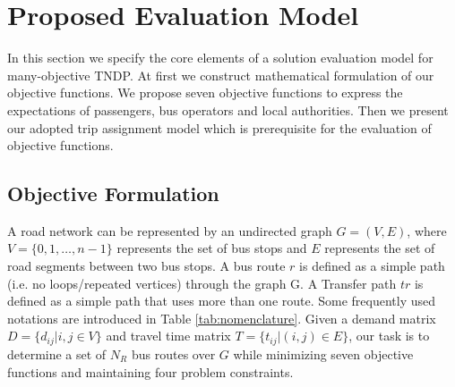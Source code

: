 
\section{Proposed Evaluation Model}

In this section we specify the core elements of a solution evaluation model for many-objective TNDP. At first we construct mathematical formulation of our objective functions. We propose seven objective functions to express the expectations of passengers, bus operators and local authorities.
Then we present our adopted trip assignment model which is prerequisite for the evaluation of objective functions.

\subsection{Objective Formulation} \label{sec:problem_formulation}

A road network can be represented by an undirected graph $ G = (V, E) $, where $ V = \{0,1,\dots,n-1\} $ represents the set of bus stops and $ E $ represents the set of road segments between two bus stops. A bus route $ r $ is defined as a simple path (i.e. no loops/repeated vertices) through the graph G. A Transfer path $ tr $ is defined as a simple path that uses more than one route. Some frequently used notations are introduced in Table \ref{tab:nomenclature}.
Given a demand matrix $ D = \{d_{ij} | i,j \in V\} $ and travel time matrix $ T = \{t_{ij} | (i,j) \in E\} $, our task is to determine a set of $ N_R $ bus routes over $ G $ while minimizing seven objective functions and maintaining four problem constraints.

